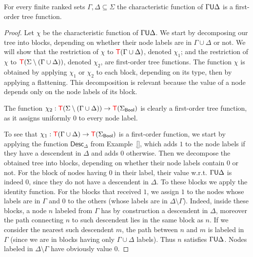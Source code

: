 \begin{lemma}\label{lem:untilmod}
For every finite ranked sets $\Gamma, \Delta \subseteq \Sigma$  the characteristic function of $\Gamma \mathsf U \Delta$ is a first-order tree function.
\end{lemma}
\begin{proof}
Let $\chi$ be the characteristic function of $\Gamma \mathsf U \Delta$.
We start by decomposing our tree into blocks, depending on whether their node labels are in $\Gamma\cup\Delta$ or not. We will show that the restriction of $\chi$ to ${\color{red}{\mathsf T}} (\Gamma\cup\Delta)$, denoted $\chi_1$; and the restriction of $\chi$ to ${\color{red}{\mathsf T}} (\Sigma\setminus(\Gamma\cup\Delta))$, denoted $\chi_2$, are first-order tree functions. The function $\chi$ is obtained by applying $\chi_1$ or $\chi_2$ to each block, depending on its type, then by applying a flattening.
This decomposition is relevant because the value of a node depends only on the node labels of its block. %

The function $\chi_2:{\color{red}{\mathsf T}} (\Sigma\setminus(\Gamma\cup\Delta))\to {\color{red}{\mathsf T}}(\Sigma_{\sf{Bool}})$ is clearly a first-order tree function, as it assigns uniformly $0$ to every node label. 

To see that $\chi_1:{\color{red}{\mathsf T}} (\Gamma\cup\Delta)\to {\color{red}{\mathsf T}}(\Sigma_{\sf{Bool}})$ 
is a first-order function, we start by applying the function $\mathsf{Desc}_\Delta$ from
Example~\ref{}, which adds $1$ to the node labels if they have a descendent in $\Delta$ and adds $0$ otherwise. Then we decompose the obtained tree into blocks, depending on whether their node labels contain $0$ or not. For the block of nodes having $0$ in their label, their value w.r.t. $\Gamma\mathsf U \Delta$ is indeed $0$, since they do not have a descendent in $\Delta$. To these blocks we apply the identity function. For the blocks that received $1$, we assign $1$ to the nodes whose labels are in  $\Gamma$ and $0$ to the others (whose labels are in $\Delta\setminus\Gamma$). Indeed, inside these blocks, a node $n$ labeled from $\Gamma$ has by construction a descendent in $\Delta$, moreover the path connecting $n$ to such descendent lies in the same block as $n$. If we consider the nearest such descendent $m$, the path between $n$ and $m$  is labeled in $\Gamma$ (since we are in blocks having only $\Gamma\cup\Delta$ labels). Thus $n$ satisfies $\Gamma\mathsf U\Delta$. Nodes labeled in $\Delta\setminus\Gamma$ have obviously value $0$.      
\end{proof}


